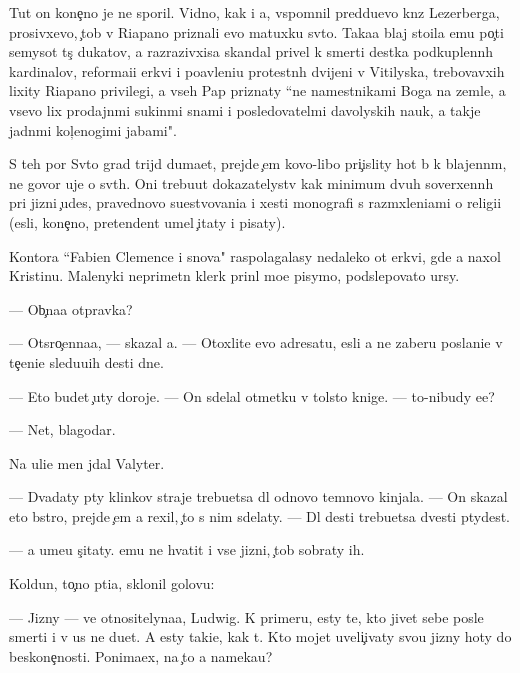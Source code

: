 \documentclass[10pt]{book}
\begin{document}
Tut on kone{\c}no je ne sporil. Vidno, kak i {\y}a, vspomnil pred{\yi}du{\x}evo kn{\ia}z{\ia} Lezerberga, prosivxevo, {\c}tob{\yi} v Riapano priznali {\y}evo matuxku sv{\ia}to{\y}. Taka{\y}a blaj sto{\y}ila {\y}emu po{\c}ti semysot t{\yi}s{\ia}{\c} dukatov, a razrazivxi{\y}sa skandal privel k smerti des{\ia}tka podkuplenn{\yi}h kardinalov, reforma{\q}i{\y}i {\Q}erkvi i po{\y}avleni{\y}u protestn{\yi}h dvijeni{\y} v Vitilyska, trebovavxih lixity Riapano privilegi{\y}, a vseh Pap priznaty ``ne namestnikami Boga na zemle, a vsevo lix prodajn{\yi}mi sukin{\yi}mi s{\yi}nami i posledovatel{\ia}mi d{\y}avolyskih nauk, a takje jadn{\yi}mi kol{\c}enogimi jabami".

S teh por Sv{\ia}to{\y} grad trijd{\yi} duma{\y}et, prejde {\c}em kovo-libo pri{\c}islity hot{\ia} b{\yi} k blajenn{\yi}m, ne govor{\ia} uje o sv{\ia}t{\yi}h. Oni trebu{\y}ut dokazatelystv kak minimum dvuh soverxenn{\yi}h pri jizni {\c}udes, pravednovo su{\x}estvovani{\y}a i xesti monografi{\y} s razm{\yi}xleni{\y}ami o religi{\y}i ({\y}esli, kone{\c}no, pretendent umel {\c}itaty i pisaty).

Kontora ``Fabien Clemence i s{\yi}nov{\y}a" raspolagalasy nedaleko ot {\q}erkvi, gde {\y}a naxol Kristinu. Malenyki{\y} neprimetn{\yi}{\y} klerk prin{\ia}l mo{\y}e pisymo, podslepovato {\x}ur{\ia}sy.

— Ob{\yi}{\c}na{\y}a otpravka?

— Otsro{\c}enna{\y}a, — skazal {\y}a. — Otoxlite {\y}evo adresatu, {\y}esli {\y}a ne zaberu poslani{\y}e v te{\c}eni{\y}e sledu{\y}u{\x}ih des{\ia}ti dne{\y}.

— Eto budet {\c}uty doroje. — On sdelal otmetku v tolsto{\y} knige. — {\C}to-nibudy {\y}e{\x}e?

— Net, blagodar{\iu}.

Na uli{\q}e men{\ia} jdal Valyter.

— Dvad{\q}aty p{\ia}ty klinkov straje{\y} trebu{\y}etsa dl{\ia} odnovo temnovo kinjala. — On skazal eto b{\yi}stro, prejde {\c}em {\y}a rexil, {\c}to s nim sdelaty. — Dl{\ia} des{\ia}ti trebu{\y}etsa dvesti p{\ia}tydes{\ia}t.

— {\Y}a ume{\y}u s{\c}itaty. {\Y}emu ne hvatit i vse{\y} jizni, {\c}tob{\yi} sobraty ih.

Koldun, to{\c}no pti{\q}a, sklonil golovu:

— Jizny — ve{\x} otnositelyna{\y}a, Ludwig. K primeru, {\y}esty te, kto jivet sebe posle smerti i v us ne du{\y}et. A {\y}esty taki{\y}e, kak t{\yi}. Kto mojet uveli{\c}ivaty svo{\y}u jizny hoty do beskone{\c}nosti. Ponima{\y}ex, na {\c}to {\y}a nameka{\y}u?
\end{document}
